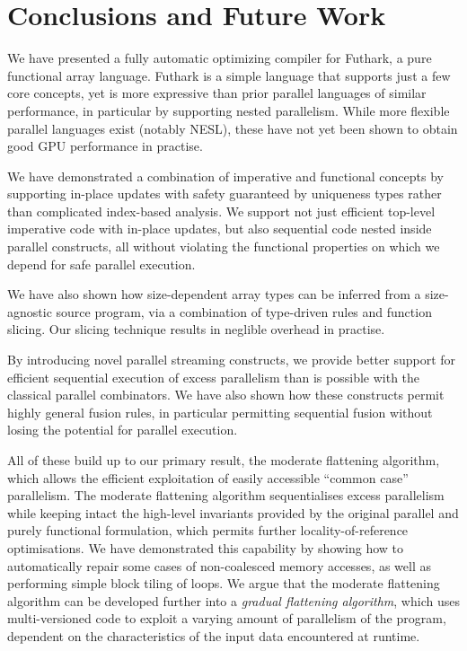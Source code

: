 \chapter{Conclusions and Future Work}
\label{chap:conclusions}

We have presented a fully automatic optimizing compiler for Futhark, a
pure functional array language.  Futhark is a simple language that
supports just a few core concepts, yet is more expressive than prior
parallel languages of similar performance, in particular by supporting
nested parallelism.  While more flexible parallel languages exist
(notably NESL), these have not yet been shown to obtain good GPU
performance in practise.

We have demonstrated a combination of imperative and functional
concepts by supporting in-place updates with safety guaranteed by
uniqueness types rather than complicated index-based analysis.  We
support not just efficient top-level imperative code with in-place
updates, but also sequential code nested inside parallel constructs,
all without violating the functional properties on which we depend for
safe parallel execution.

We have also shown how size-dependent array types can be inferred from
a size-agnostic source program, via a combination of type-driven rules
and function slicing.  Our slicing technique results in neglible
overhead in practise.

By introducing novel parallel streaming constructs, we provide better
support for efficient sequential execution of excess parallelism than
is possible with the classical parallel combinators.  We have also
shown how these constructs permit highly general fusion rules, in
particular permitting sequential fusion without losing the potential
for parallel execution.

All of these build up to our primary result, the moderate flattening
algorithm, which allows the efficient exploitation of easily
accessible ``common case'' parallelism.  The moderate flattening
algorithm sequentialises excess parallelism while keeping intact the
high-level invariants provided by the original parallel and purely
functional formulation, which permits further locality-of-reference
optimisations.  We have demonstrated this capability by showing how to
automatically repair some cases of non-coalesced memory accesses, as
well as performing simple block tiling of loops.  We argue that the
moderate flattening algorithm can be developed further into a
\textit{gradual flattening algorithm}, which uses multi-versioned code
to exploit a varying amount of parallelism of the program, dependent
on the characteristics of the input data encountered at runtime.

